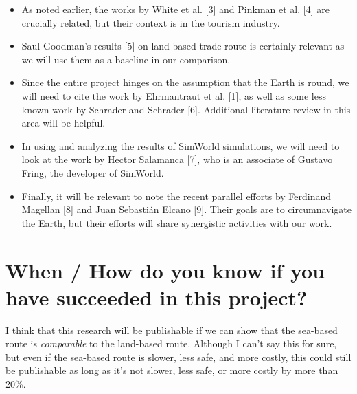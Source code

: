 \documentclass{proc}
\begin{document}
\begin{itemize}
\item As noted earlier, the works by White et al. [3] and Pinkman et al. [4] are crucially related, but their context is in the tourism industry.

\item Saul Goodman's results [5] on land-based trade route is certainly relevant as we will use them as a baseline in our comparison.

\item Since the entire project hinges on the assumption that the Earth is round, we will need to cite the work by Ehrmantraut et al. [1], as well as some less known work by Schrader and Schrader [6].  Additional literature review in this area will be helpful.

\item In using and analyzing the results of SimWorld simulations, we will need to look at the work by Hector Salamanca [7], who is an associate of Gustavo Fring, the developer of SimWorld.

\item Finally, it will be relevant to note the recent parallel efforts by Ferdinand Magellan [8] and Juan Sebastián Elcano [9].  Their goals are to circumnavigate the Earth, but their efforts will share synergistic activities with our work.
 \end{itemize}


\section{When / How do you know if you have succeeded in this project?}

I think that this research will be publishable if we can show that the sea-based route is \emph{comparable} to the land-based route.  Although I can't say this for sure, but even if the sea-based route is slower, less safe, and more costly, this could still be publishable as long as it's not slower, less safe, or more costly by more than 20\%.

%
\end{document}
